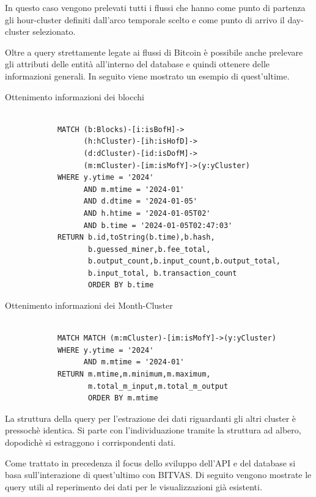 In questo caso vengono prelevati tutti i flussi che hanno come punto di partenza gli hour-cluster definiti dall'arco temporale scelto e come punto di arrivo il day-cluster selezionato.

Oltre a query strettamente legate ai flussi di Bitcoin è possibile anche prelevare gli attributi delle entità all'interno del database e quindi ottenere delle informazioni generali. In seguito viene mostrato un esempio di quest'ultime.

\newpage \thispagestyle{mystyle}

\begin{center}
Ottenimento informazioni dei blocchi
\begin{lstlisting}

            MATCH (b:Blocks)-[i:isBofH]->
                  (h:hCluster)-[ih:isHofD]->
                  (d:dCluster)-[id:isDofM]->
                  (m:mCluster)-[im:isMofY]->(y:yCluster)
            WHERE y.ytime = '2024'  
                  AND m.mtime = '2024-01' 
                  AND d.dtime = '2024-01-05' 
                  AND h.htime = '2024-01-05T02'
                  AND b.time = '2024-01-05T02:47:03'
            RETURN b.id,toString(b.time),b.hash,
                   b.guessed_miner,b.fee_total,
                   b.output_count,b.input_count,b.output_total,
                   b.input_total, b.transaction_count 
                   ORDER BY b.time
\end{lstlisting} 
\end{center}
\vspace{5mm}
\begin{center}
Ottenimento informazioni dei Month-Cluster
\begin{lstlisting}

            MATCH MATCH (m:mCluster)-[im:isMofY]->(y:yCluster)
            WHERE y.ytime = '2024'  
                  AND m.mtime = '2024-01'
            RETURN m.mtime,m.minimum,m.maximum,
                   m.total_m_input,m.total_m_output
                   ORDER BY m.mtime
\end{lstlisting} 
\end{center}

La struttura della query per l'estrazione dei dati riguardanti gli altri cluster è pressochè identica.
Si parte con l'individuazione tramite la struttura ad albero, dopodichè si estraggono i corrispondenti dati.

Come trattato in precedenza il focus dello sviluppo dell'API e del database si basa sull'interazione di quest'ultimo con BITVAS. Di seguito vengono mostrate le query utili al reperimento dei dati per le visualizzazioni già esistenti.

